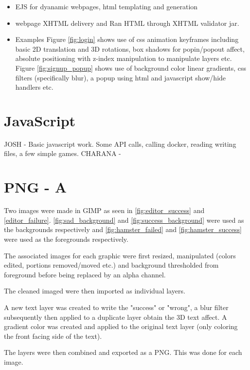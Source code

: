 \documentclass[a4paper]{article}
\begin{document}
\begin {itemize}
	\item EJS for dyanamic webpages, html templating and generation
    \item webpage XHTML delivery and Ran HTML through XHTML validator jar.
    \item Examples
    	\subitem Figure \ref{fig:login} shows use of css animation keyframes including basic 2D translation and 3D rotations, box shadows for popin/popout affect, absolute positioning with z-index manipulation to manipulate layers etc.
        \subitem Figure \ref{fig:signup_popup} shows use of background color linear gradients, css filters (specifically blur), a popup using html and javascript show/hide handlers  etc.
\end {itemize}

\section{JavaScript}
JOSH - Basic javascript work. Some API calls, calling docker, reading 
writing files, a few simple games.
CHARANA - 

\section{PNG - A}

Two images were made in GIMP as seen in \ref{fig:editor_success} and \ref{editor_failure}.
\ref{fig:sad_background} and \ref{fig:success_background} were used as the backgrounds respectively and \ref{fig:hamster_failed} and \ref{fig:hamster_success} were used as the foregrounds respectively.

The associated images for each graphic were first resized, manipulated (colors edited, portions removed/moved etc.) and background thresholded from foreground before being replaced by an alpha channel.

The cleaned imaged were then imported as individual layers.

A new text layer was created to write the "success" or "wrong", a blur filter subsequently then applied to a duplicate layer obtain the 3D text affect.
A gradient color was created and applied to the original text layer (only coloring the front facing side of the text).

The layers were then combined and exported as a PNG.
This was done for each image.
\end{document}
